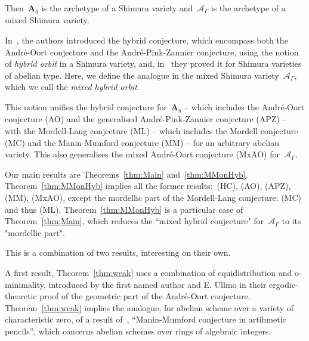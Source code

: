 \documentclass[12pt]{amsart}
\begin{document}
Then~$\mathbf{A}_g$ is the archetype of a Shimura variety and~$\mathcal{A}_\Gamma$ is the archetype of a mixed Shimura variety.

In~\cite{RY:LMS1}, the authors introduced the hybrid conjecture, which encompass both the André-Oort conjecture and the André-Pink-Zannier conjecture, using the notion of \emph{hybrid orbit} in a Shimura variety, and, in~\cite{RY:LMS2} they proved it for Shimura varieties of abelian type.
Here, we define the analogue in the mixed Shimura variety~$\mathcal{A}_\Gamma$, which we call the \emph{mixed hybrid orbit}. 

This notion unifies the hybrid conjecture for~$\mathbf{A}_g$ -- which includes the André-Oort conjecture (AO) and the generalised André-Pink-Zannier conjecture (APZ) --  with the Mordell-Lang conjecture (ML) -- which includes the Mordell conjecture (MC) and the Manin-Mumford conjecture (MM) -- for an arbitrary abelian variety. This also generalises the mixed André-Oort conjecture (MxAO) for~$\mathcal{A}_\Gamma$.

Our main results are Theorems~\ref{thm:Main} and~\ref{thm:MMonHyb}. Theorem~\ref{thm:MMonHyb} implies all the former results:~(HC), (AO), (APZ), (MM), (MxAO), except the mordellic part of the Mordell-Lang conjecture:  (MC) and thus (ML). Theorem~\ref{thm:MMonHyb} is a particular case of Theorem~\ref{thm:Main}, which reduces the ``mixed hybrid conjecture" for~$\mathcal{A}_\Gamma$ to its "mordellic part".

This is a combination of two results, interesting on their own. 

A first result, Theorem~\ref{thm:weak} uses a combination of equidistribution and o-minimality, introduced by the first named author and E. Ullmo in their ergodic-theoretic proof of the geometric part of the André-Oort conjecture. Theorem~\ref{thm:weak} implies the analogue, for abelian scheme over a variety of characteristic zero, of a result of~\cite{BRU}, ``Manin-Mumford conjecture in artihmetic pencils'', which concerns abelian schemes over rings of algebraic integers.
\end{document}

